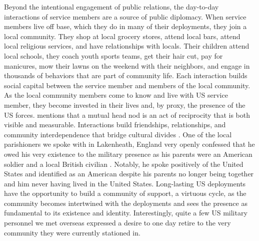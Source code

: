{	
	Beyond the intentional engagement of public relations, the day-to-day interactions of service members are a source of public diplomacy. When service members live off base, which they do in many of their deployments, they join a local community. They shop at local grocery stores, attend local bars, attend local religious services, and have relationships with locals. Their children attend local schools, they coach youth sports teams, get their hair cut, pay for manicures, mow their lawns on the weekend with their neighbors, and engage in thousands of behaviors that are part of community life. Each interaction builds social capital between the service member and members of the local community. As the local community members come to know and live with US service member, they become invested in their lives and, by proxy, the presence of the US forces.  mentions that a mutual head nod is an act of reciprocity that is both visible and measurable. Interactions build friendships, relationships, and community interdependence that bridge cultural divides \cite{Woolcock2000}. One of the local parishioners we spoke with in Lakenheath, England very openly confessed that he owed his very existence to the military presence as his parents were an American soldier and a local British civilian \cite{councilone20190718}. Notably, he spoke positively of the United States and identified as an American despite his parents no longer being together and him never having lived in the United States. Long-lasting US deployments have the opportunity to build a community of support, a virtuous cycle, as the community becomes intertwined with the deployments and sees the presence as fundamental to its existence and identity. Interestingly, quite a few US military personnel we met overseas expressed a desire to one day retire to the very community they were currently stationed in.
	
}
